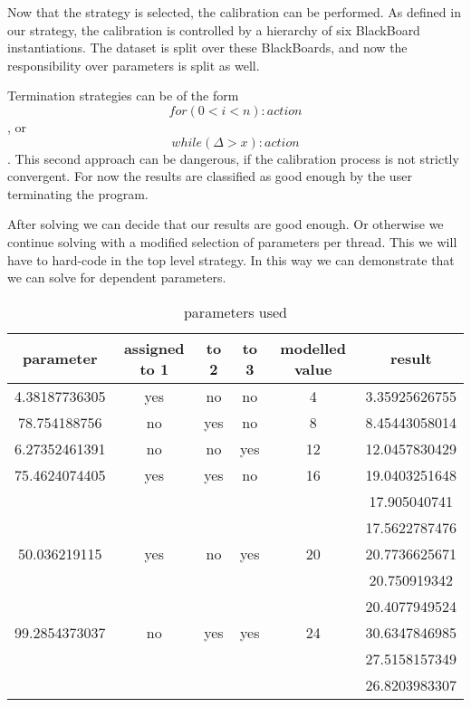 \documentclass[]{lofar}
\begin{document}
      Now that the strategy is selected, the calibration can be
      performed.  As defined in our strategy, the calibration is
      controlled by a hierarchy of six BlackBoard instantiations. The
      dataset is split over these BlackBoards, and now the
      responsibility over parameters is split as well.

      Termination strategies can be of the form \[for ( 0 < i < n ) :
      action\], or \[while (\Delta > x): action\]. This second
      approach can be dangerous, if the calibration process is not
      strictly convergent. For now the results are classified as good
      enough by the user terminating the program.

      After solving we can decide that our results are good enough. Or
      otherwise we continue solving with a modified selection of
      parameters per thread. This we will have to hard-code in the top
      level strategy. In this way we can demonstrate that we can solve
      for dependent parameters.

      \begin{table}[hbt]
        \begin{center}%
          \hypertarget{parametertable}{}%
          \caption{parameters used}
          \begin{tabular}{|c|c|c|c|c|c|}
            \hline 
            parameter & assigned to 1 & to 2 & to 3 & modelled value & result\tabularnewline
            \hline 
            4.38187736305 & yes & no & no & 4 & 3.35925626755 \tabularnewline
            \hline 
            78.754188756 & no & yes & no & 8 & 8.45443058014 \tabularnewline
            \hline 
            6.27352461391 & no & no & yes & 12 & 12.0457830429 \tabularnewline
            \hline 
            75.4624074405 & yes & yes & no & 16 & 19.0403251648 \tabularnewline
            \hline 
            & & & & & 17.905040741 \tabularnewline
            \hline 
            & & & & & 17.5622787476 \tabularnewline
            \hline 
            50.036219115 & yes & no & yes & 20 & 20.7736625671 \tabularnewline
            \hline
            & & & & & 20.750919342 \tabularnewline
            \hline
            & & & & & 20.4077949524 \tabularnewline
            \hline
            99.2854373037 & no & yes & yes & 24 & 30.6347846985 \tabularnewline
            \hline 
            & & & & & 27.5158157349 \tabularnewline
            \hline
            & & & & & 26.8203983307 \tabularnewline
            \hline
          \end{tabular}
          \label{parametertable}
        \end{center}
      \end{table}
\end{document}
